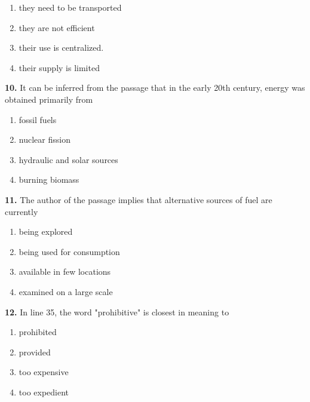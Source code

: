 \documentclass[12pt]{article}
\begin{document}
\begin{enumerate}[label=(\Alph*),leftmargin=*,itemsep=0.2em]
\item they need to be transported
\item they are not efficient
\item their use is centralized.
\item their supply is limited
\end{enumerate}
\par
\vspace{0.25\baselineskip}
\noindent\textbf{10.} It can be inferred from the passage that in the early 20th century, energy was obtained primarily from
\begin{enumerate}[label=(\Alph*),leftmargin=*,itemsep=0.2em]
\item fossil fuels
\item nuclear fission
\item hydraulic and solar sources
\item burning biomass
\end{enumerate}
\par
\vspace{0.25\baselineskip}
\noindent\textbf{11.} The author of the passage implies that alternative sources of fuel are currently
\begin{enumerate}[label=(\Alph*),leftmargin=*,itemsep=0.2em]
\item being explored
\item being used for consumption
\item available in few locations
\item examined on a large scale
\end{enumerate}
\par
\vspace{0.25\baselineskip}
\noindent\textbf{12.} In line 35, the word "prohibitive" is closest in meaning to
\begin{enumerate}[label=(\Alph*),leftmargin=*,itemsep=0.2em]
\item prohibited
\item provided
\item too expensive
\item too expedient
\end{enumerate}
\par
\vspace{0.25\baselineskip}
\end{document}
